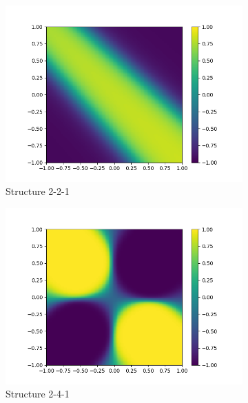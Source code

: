 \begin{figure}[ht!]
  \centering
  \begin{subfigure}[b]{.3\linewidth}
    \includegraphics[width=\linewidth]{fig/xor221_eta009.png}
    \caption{Structure 2-2-1}
    \label{fig:struct221}
  \end{subfigure}
  \quad
  \begin{subfigure}[b]{.3\linewidth}
    \includegraphics[width=\linewidth]{fig/xor241_eta016.png}
    \caption{Structure 2-4-1}
    \label{fig:struct241}
  \end{subfigure}
  \quad
  \begin{subfigure}[b]{.3\linewidth}

\end{subfigure}
\end{figure}
